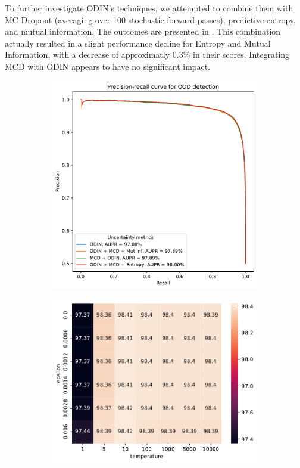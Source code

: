 To further investigate ODIN's techniques, we attempted to combine them with MC Dropout (averaging over 100 stochastic forward passes), predictive entropy, and mutual information. The outcomes are presented in . This combination actually resulted in a slight performance decline for Entropy and Mutual Information, with a decrease of approximatly $0.3\%$ in their scores. Integrating MCD with ODIN appears to have no significant impact.
\begin{figure}[H]
    \centering
    \begin{subfigure}{0.45\textwidth}
        \includegraphics[width=\textwidth]{OOD_aupr_combo.pdf}
        \caption{}
        \label{fig:OOD_aupr_combo}
    \end{subfigure}%
    \begin{subfigure}{0.45\textwidth}
        \includegraphics[width=\textwidth]{odin_grid_search.pdf}
        \caption{}
        \label{fig:odin_grid_search}
    \end{subfigure}%
    \caption{}
\end{figure}

